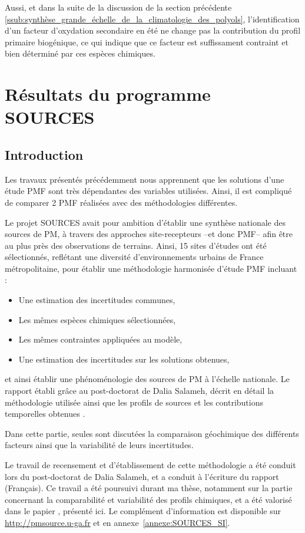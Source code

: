 Aussi, et dans la suite de la discussion de la section précédente
\ref{ssub:synthèse_grande_échelle_de_la_climatologie_des_polyols}, l'identification d'un
facteur d'oxydation secondaire en été ne change pas la contribution du profil primaire
biogénique, ce qui indique que ce facteur est suffissament contraint et bien déterminé
par ces espèces chimiques.

\section{Résultats du programme SOURCES}%
\label{sec:sources}

\subsection{Introduction}

Les travaux présentés précédemment nous apprennent que les solutions d'une étude PMF sont
très dépendantes des variables utilisées. Ainsi, il est compliqué de comparer 2 PMF
réalisées avec des méthodologies différentes.

Le projet SOURCES avait pour ambition d'établir une synthèse nationale des
sources de PM, à travers des approches site-recepteurs --et donc PMF-- afin être au plus
près des observations de terrains.
Ainsi, 15 sites d'études ont été sélectionnés, reflétant une diversité d'environnements
urbains de France métropolitaine, pour établir une méthodologie harmonisée d'étude PMF
incluant :
\begin{itemize}
    \item Une estimation des incertitudes communes,
    \item Les mêmes espèces chimiques sélectionnées,
    \item Les mêmes contraintes appliquées au modèle,
    \item Une estimation des incertitudes sur les solutions obtenues,
\end{itemize}
et ainsi établir une phénoménologie des sources de PM à l'échelle nationale.
Le rapport établi grâce au post-doctorat de Dalia Salameh,
décrit en détail la méthodologie utilisée ainsi que les profils de sources et les
contributions temporelles obtenues \parencite{favezTraitement2017}.

Dans cette partie, seules sont discutées la comparaison géochimique des différents
facteurs ainsi que la variabilité de leurs incertitudes.

\begin{tcolorbox}[colback=red!5!white,colframe=Melon,title=Note]
    Le travail de recensement et d'établissement de cette méthodologie a été conduit lors
    du post-doctorat de Dalia Salameh, et a conduit à l'écriture du rapport 
    \cite{favezTraitement2017} (Français). Ce travail a été poursuivi durant ma thèse,
    notamment sur la partie concernant la comparabilité et variabilité des profils
    chimiques, et a été valorisé dans le papier \cite{weberComparison2019}, présenté ici.
    Le complément d'information est disponible sur \url{http://pmsource.u-ga.fr} et en
    annexe~\ref{annexe:SOURCES_SI}.
\end{tcolorbox}


